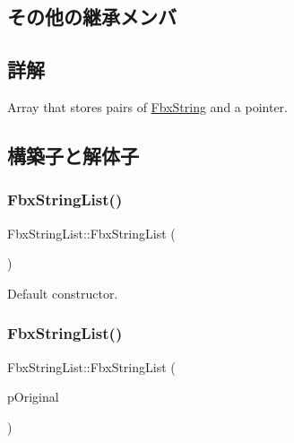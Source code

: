 \subsection*{その他の継承メンバ}


\subsection{詳解}
Array that stores pairs of \hyperlink{class_fbx_string}{Fbx\+String} and a pointer. 

\subsection{構築子と解体子}
\mbox{\label{class_fbx_string_list_a412df9e48bc17c5c1fdfbea296855196}} 
\subsubsection{\texorpdfstring{Fbx\+String\+List()}{FbxStringList()}\hspace{0.1cm}{\footnotesize\ttfamily [1/2]}}
{\footnotesize\ttfamily Fbx\+String\+List\+::\+Fbx\+String\+List (\begin{DoxyParamCaption}{ }\end{DoxyParamCaption})}



Default constructor. 

\mbox{\label{class_fbx_string_list_a2bf8796a8d075564468db9aa188b4f31}} 
\subsubsection{\texorpdfstring{Fbx\+String\+List()}{FbxStringList()}\hspace{0.1cm}{\footnotesize\ttfamily [2/2]}}
{\footnotesize\ttfamily Fbx\+String\+List\+::\+Fbx\+String\+List (\begin{DoxyParamCaption}\item[{const \hyperlink{class_fbx_string_list}{Fbx\+String\+List} \&}]{p\+Original }\end{DoxyParamCaption})}



